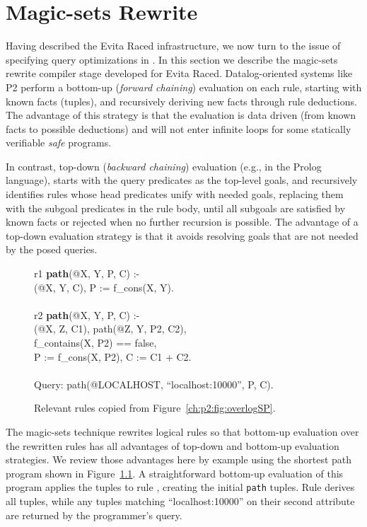 \chapter[Magic-sets Rewrite]{Magic-sets Rewrite}
\label{ch:magic}

Having described the Evita Raced infrastructure, we now turn to the issue of
specifying query optimizations in \OVERLOG.  In this section we describe the
magic-sets rewrite compiler stage developed for Evita Raced.  Datalog-oriented
systems like P2 perform a bottom-up (\emph{forward chaining}) evaluation on
each rule, starting with known facts (tuples), and recursively deriving new
facts through rule deductions.  The advantage of this strategy is that the
evaluation is data driven (from known facts to possible deductions) and will
not enter infinite loops for some statically verifiable \emph{safe} programs.

In contrast, top-down (\emph{backward chaining}) evaluation (e.g., in the
Prolog language), starts with the query predicates as the top-level goals, and
recursively identifies rules whose head predicates unify with needed goals,
replacing them with the subgoal predicates in the rule body, until all subgoals
are satisfied by known facts or rejected when no further recursion is possible.
The advantage of a top-down evaluation strategy is that it avoids resolving
goals that are not needed by the posed queries.

\begin{figure}[!t]
\ssp
\centering
\begin{boxedminipage}{\linewidth}
r1 {\bf path}(@X, Y, P, C) :- \\
(@X, Y, C), P := f\_cons(X, Y). \\
\\
r2 {\bf path}(@X, Y, P, C) :- \\
(@X, Z, C1), path(@Z, Y, P2, C2),\\
\datalogspace f\_contains(X, P2) == false, \\
\datalogspace P := f\_cons(X, P2), C := C1 + C2. \\
\\
Query: path(@LOCALHOST, ``localhost:10000'', P, C).
\end{boxedminipage}
\caption{\label{ch:evita:fig:querySP}Relevant rules copied from Figure~\ref{ch:p2:fig:overlogSP}.}
\end{figure}

The magic-sets technique rewrites logical rules so that bottom-up evaluation
over the rewritten rules has all advantages of top-down and bottom-up
evaluation strategies.  We review those advantages here by example using the
shortest path program shown in Figure~\ref{ch:evita:fig:querySP}.  A
straightforward bottom-up evaluation of this program applies the 
tuples to rule , creating the initial {\tt path} tuples.  Rule 
derives all  tuples, while any  tuples matching
``localhost:10000'' on their second attribute are returned by the programmer's
query.

